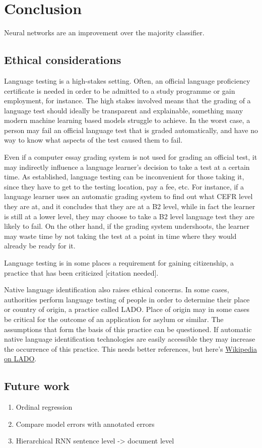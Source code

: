 \chapter{Conclusion}

Neural networks are an improvement over the majority classifier.


\section{Ethical considerations}

Language testing is a high-stakes setting. Often, an official language
proficiency certificate is needed in order to be admitted to a study
programme or gain employment, for instance. The high stakes involved means
that the grading of a language test should ideally be transparent and
explainable, something many modern machine learning based models struggle to
achieve. In the worst case, a person may fail an official language test that
is graded automatically, and have no way to know what aspects of the test
caused them to fail.

Even if a computer essay grading system is not used for grading an official
test, it may indirectly influence a language learner's decision to take a
test at a certain time. As established, language testing can be inconvenient
for those taking it, since they have to get to the testing location, pay a
fee, etc. For instance, if a language learner uses an automatic grading
system to find out what CEFR level they are at, and it concludes that they
are at a B2 level, while in fact the learner is still at a lower level, they
may choose to take a B2 level language test they are likely to fail. On the
other hand, if the grading system undershoots, the learner may waste time by
not taking the test at a point in time where they would already be ready for
it.

Language testing is in some places a requirement for gaining citizenship, a
practice that has been criticized [citation needed]. 

Native language identification also raises ethical concerns. In some cases,
authorities perform language testing of people in order to determine their
place or country of origin, a practice called \ac{LADO}. Place of origin may
in some cases be critical for the outcome of an application
for asylum or similar. The assumptions that form the basis of this practice
can be questioned. If automatic native language identification technologies
are easily accessible they may increase the occurrence of this practice. This
needs better references, but here's
\href{https://en.wikipedia.org/wiki/Language_analysis_for_the_determination_of_origin}{Wikipedia
on \ac{LADO}}.


\section{Future work}

\begin{enumerate}
    \item Ordinal regression
    \item Compare model errors with annotated errors
    \item Hierarchical RNN sentence level -> document level
\end{enumerate}
